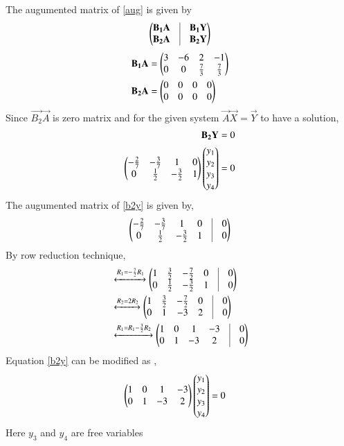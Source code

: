 \documentclass[journal,12pt,twocolumn]{IEEEtran}
\begin{document}
The augumented matrix of \eqref{aug} is given by 
\begin{align}
    \myvec{\vec{B_1}\vec{A} & \vrule & \vec{B_1}\vec{Y}\\
    \vec{B_2}\vec{A} & \vrule & \vec{B_2}\vec{Y}}
\end{align}
\begin{align}
    \mathbf{B_1}\mathbf{A}&=\begin{pmatrix}3 & -6 & 2 & -1\\0 & 0 & \frac{7}{3} & \frac{7}{3}\end{pmatrix}\\
    \mathbf{B_2}\mathbf{A}&=\begin{pmatrix}0 & 0 & 0 & 0\\ 0 & 0 & 0 & 0\end{pmatrix}
\end{align}
Since $\vec{B_2}\vec{A}$ is zero matrix and for the given system $\vec{A}\vec{X}=\vec{Y}$ to have a solution,
\begin{align}
\mathbf{B_2}\mathbf{Y}&=0\label{b1}\\
\begin{pmatrix}-\frac{2}{7} & -\frac{3}{7} & 1 & 0 \\ 0 & \frac{1}{2} & -\frac{3}{2} & 1\end{pmatrix}\begin{pmatrix}y_1\\y_2\\y_3\\y_4\end{pmatrix}&=0\label{b2y}
\end{align}
The augumented matrix of \eqref{b2y} is given by,
\begin{align}
    \myvec{-\frac{2}{7} & -\frac{3}{7} & 1 & 0 &\vrule & 0 \\ 0 & \frac{1}{2} & -\frac{3}{2} & 1 & \vrule & 0}
\end{align}
By row reduction technique,
\begin{align}
        &\xleftrightarrow{R_1=-\frac{7}{2}R_1}\myvec{1 & \frac{3}{2} &-\frac{7}{2}  & 0 &\vrule & 0 \\ 0 & \frac{1}{2} & -\frac{3}{2} & 1 & \vrule & 0}\\
        &\xleftrightarrow{R_2=2R_2}\myvec{1 & \frac{3}{2} &-\frac{7}{2}  & 0 &\vrule & 0 \\ 0 & 1 & -3 & 2 & \vrule & 0}\\
        &\xleftrightarrow{R_1=R_1-\frac{3}{2}R_2}\myvec{1 & 0 &1  & -3 &\vrule & 0 \\ 0 & 1 & -3 & 2 & \vrule & 0}
\end{align}
Equation \eqref{b2y} can be modified as , 
\begin{align}
    \begin{pmatrix}1 & 0 & 1 & -3 \\ 0 & 1 & -3 & 2\end{pmatrix}\begin{pmatrix}y_1\\y_2\\y_3\\y_4\end{pmatrix}&=0
\end{align}
Here $y_3$ and $y_4$ are free variables
\end{document}
